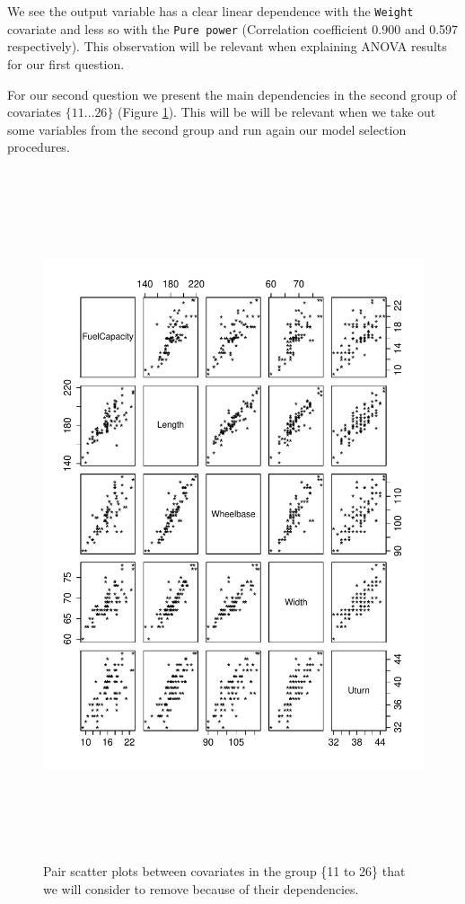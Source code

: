 \documentclass[12pt]{article}
\begin{document}
We see the output variable has a clear linear dependence with the \texttt{Weight} covariate and less so with the \texttt{Pure power} (Correlation coefficient 0.900 and 0.597 respectively).
This observation will be relevant when explaining ANOVA results for our first question.

For our second question we present the main dependencies in the second group of covariates $\{11\ldots 26\}$ (Figure \ref{fig:pairs}).
This will be will be relevant when we take out some variables from the second group and run
again our model selection procedures.
\begin{figure}[h!]
\centering
\includegraphics[width=6in,height=8in]{Pairs.pdf}
\caption{Pair scatter plots between covariates in the group \{11 to 26\} that we will consider to remove because of their dependencies.}
\label{fig:pairs}
\end{figure}
\end{document}

